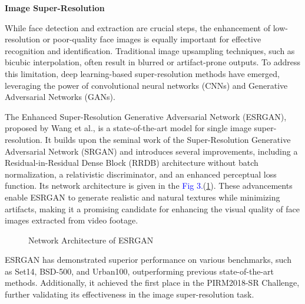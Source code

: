 \pagebreak{}

\textbf{Image Super-Resolution}

While face detection and extraction are crucial steps, the enhancement of low-resolution or poor-quality face images is equally important for effective recognition and identification. Traditional image upsampling techniques, such as bicubic interpolation, often result in blurred or artifact-prone outputs. To address this limitation, deep learning-based super-resolution methods have emerged, leveraging the power of convolutional neural networks (CNNs) and Generative Adversarial Networks (GANs).

The Enhanced Super-Resolution Generative Adversarial Network (ESRGAN), proposed by Wang et al., is a state-of-the-art model for single image super-resolution. It builds upon the seminal work of the Super-Resolution Generative Adversarial Network (SRGAN) and introduces several improvements, including a Residual-in-Residual Dense Block (RRDB) architecture without batch normalization, a relativistic discriminator, and an enhanced perceptual loss function.  Its network architecture is given in the {\textcolor{blue}{Fig 3.}}(\ref{fig:ESRGan}). These advancements enable ESRGAN to generate realistic and natural textures while minimizing artifacts, making it a promising candidate for enhancing the visual quality of face images extracted from video footage.

\begin{figure}[H]
    \centering
    \caption{Network Architecture of ESRGAN}
    \label{fig:ESRGan}
\end{figure}

ESRGAN has demonstrated superior performance on various benchmarks, such as Set14, BSD-500, and Urban100, outperforming previous state-of-the-art methods. Additionally, it achieved the first place in the PIRM2018-SR Challenge, further validating its effectiveness in the image super-resolution task. 

